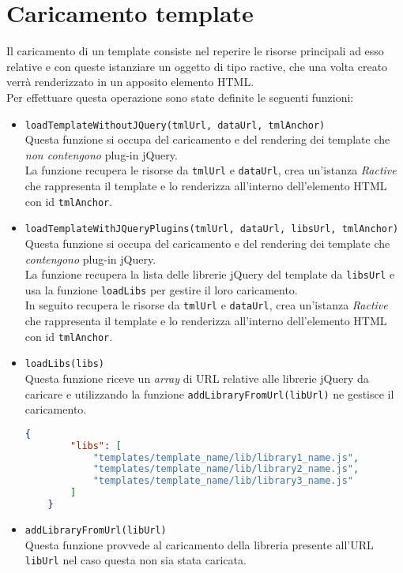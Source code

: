 \section{Caricamento template}
Il caricamento di un template consiste nel reperire le risorse principali ad esso relative e con queste istanziare un oggetto di tipo ractive, che una volta creato verrà renderizzato in un apposito elemento HTML.\\
Per effettuare questa operazione sono state definite le seguenti funzioni:
\begin{itemize}
	\item \texttt{loadTemplateWithoutJQuery(tmlUrl, dataUrl, tmlAnchor)}\\
	Questa funzione si occupa del caricamento e del rendering dei template che \textit{non contengono} plug-in jQuery.\\
	La funzione recupera le risorse da \texttt{tmlUrl} e \texttt{dataUrl}, crea un'istanza \textit{Ractive} che rappresenta il template e lo renderizza all'interno dell'elemento HTML con id \texttt{tmlAnchor}.
	
	\item \texttt{loadTemplateWithJQueryPlugins(tmlUrl, dataUrl, libsUrl, tmlAnchor)}\\
	Questa funzione si occupa del caricamento e del rendering dei template che \textit{contengono} plug-in jQuery.\\
	La funzione recupera la lista delle librerie jQuery del template da \texttt{libsUrl} e usa la funzione \texttt{loadLibs} per gestire il loro caricamento.\\
	In seguito recupera le risorse da \texttt{tmlUrl} e \texttt{dataUrl}, crea un'istanza \textit{Ractive} che rappresenta il template e lo renderizza all'interno dell'elemento HTML con id \texttt{tmlAnchor}.
	
	\newpage
	\item \texttt{loadLibs(libs)}\\
	Questa funzione riceve un \textit{array} di URL relative alle librerie jQuery da caricare e utilizzando la funzione \texttt{addLibraryFromUrl(libUrl)} ne gestisce il caricamento.
	\begin{lstlisting}[language=JSON, caption=Esempio array \texttt{libs}.]
	{
		"libs": [
			"templates/template_name/lib/library1_name.js",
			"templates/template_name/lib/library2_name.js",
			"templates/template_name/lib/library3_name.js"
		]
	}
	\end{lstlisting}
	
	\item \texttt{addLibraryFromUrl(libUrl)}\\
	Questa funzione provvede al caricamento della libreria presente all'URL \texttt{libUrl} nel caso questa non sia stata caricata.
	
\end{itemize}
